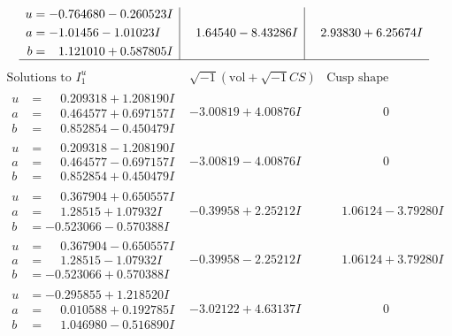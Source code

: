 \documentclass[1p]{elsarticle_modified}
\theoremstyle{definition}
\newcommand{\I}{\sqrt{-1}}
\begin{document}
$$\begin{array}{c|c|c}
\begin{aligned}
u &= -0.764680 - 0.260523 I \\
a &= -1.01456 - 1.01023 I \\
b &= \phantom{-}1.121010 + 0.587805 I\end{aligned}
 & \phantom{-}1.64540 - 8.43286 I & \phantom{-}2.93830 + 6.25674 I\\
 \hline 
 \end{array}$$\newpage$$\begin{array}{c|c|c}  
\text{Solutions to }I^u_{1}& \I (\text{vol} + \sqrt{-1}CS) & \text{Cusp shape}\\
 \hline 
\begin{aligned}
u &= \phantom{-}0.209318 + 1.208190 I \\
a &= \phantom{-}0.464577 + 0.697157 I \\
b &= \phantom{-}0.852854 - 0.450479 I\end{aligned}
 & -3.00819 + 4.00876 I & \phantom{-0.000000 } 0 \\ \hline\begin{aligned}
u &= \phantom{-}0.209318 - 1.208190 I \\
a &= \phantom{-}0.464577 - 0.697157 I \\
b &= \phantom{-}0.852854 + 0.450479 I\end{aligned}
 & -3.00819 - 4.00876 I & \phantom{-0.000000 } 0 \\ \hline\begin{aligned}
u &= \phantom{-}0.367904 + 0.650557 I \\
a &= \phantom{-}1.28515 + 1.07932 I \\
b &= -0.523066 - 0.570388 I\end{aligned}
 & -0.39958 + 2.25212 I & \phantom{-}1.06124 - 3.79280 I \\ \hline\begin{aligned}
u &= \phantom{-}0.367904 - 0.650557 I \\
a &= \phantom{-}1.28515 - 1.07932 I \\
b &= -0.523066 + 0.570388 I\end{aligned}
 & -0.39958 - 2.25212 I & \phantom{-}1.06124 + 3.79280 I \\ \hline\begin{aligned}
u &= -0.295855 + 1.218520 I \\
a &= \phantom{-}0.010588 + 0.192785 I \\
b &= \phantom{-}1.046980 - 0.516890 I\end{aligned}
 & -3.02122 + 4.63137 I & \phantom{-0.000000 } 0 \\ \hline\begin{aligned}

\end{aligned}
\end{array}$$
\end{document}
